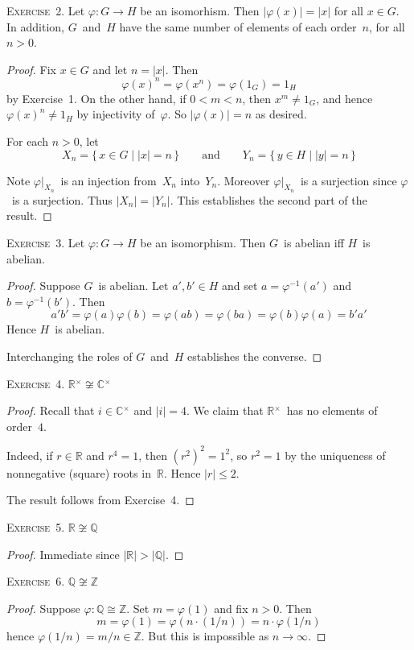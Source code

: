 \documentclass[letterpaper]{article}
\newcommand{\exercise}[1]{\goodbreak\noindent\textsc{Exercise~{#1}.}}
\newcommand{\Z}{\mathbb{Z}}
\newcommand{\Q}{\mathbb{Q}}
\newcommand{\R}{\mathbb{R}}
\newcommand{\C}{\mathbb{C}}
\newcommand{\iso}{\cong}
\newcommand{\mi}[1]{{#1}{}^{\times}}
\newcommand{\ord}[1]{|{#1}|}
\begin{document}
\exercise{2}
Let $\varphi:G\to H$ be an isomorhism. Then $\ord{\varphi(x)}=\ord{x}$ for all $x\in G$. In addition, $G$~and~$H$ have the same number of elements of each order~$n$, for all $n>0$.
\begin{proof}
Fix $x\in G$ and let $n=\ord{x}$. Then
$$\varphi(x)^n=\varphi(x^n)=\varphi(1_G)=1_H$$
by Exercise~1. On the other hand, if $0<m<n$, then $x^m\ne 1_G$, and hence $\varphi(x)^n\ne 1_H$ by injectivity of~$\varphi$. So $\ord{\varphi(x)}=n$ as desired.

For each $n>0$, let
$$X_n=\{\,x\in G\mid \ord{x}=n\,\}\qquad\text{and}\qquad Y_n=\{\,y\in H\mid \ord{y}=n\,\}$$

Note $\varphi|_{X_n}$~is an injection from~$X_n$ into~$Y_n$. Moreover $\varphi|_{X_n}$~is a surjection since $\varphi$~is a surjection. Thus $\ord{X_n}=\ord{Y_n}$. This establishes the second part of the result.
\end{proof}

\exercise{3}
Let $\varphi:G\to H$ be an isomorphism. Then $G$~is abelian iff $H$~is abelian.
\begin{proof}
Suppose $G$~is abelian. Let $a',b'\in H$ and set $a=\varphi^{-1}(a')$ and $b=\varphi^{-1}(b')$. Then
$$a'b'=\varphi(a)\varphi(b)=\varphi(ab)=\varphi(ba)=\varphi(b)\varphi(a)=b'a'$$
Hence $H$~is abelian.

Interchanging the roles of $G$~and~$H$ establishes the converse.
\end{proof}

\exercise{4}
$\mi{\R}\not\iso\mi{\C}$
\begin{proof}
Recall that $i\in\mi{\C}$ and $\ord{i}=4$. We claim that $\mi{\R}$~has no elements of order~$4$.

Indeed, if $r\in\R$ and $r^4=1$, then $(r^2)^2=1^2$, so $r^2=1$ by the uniqueness of nonnegative (square) roots in~$\R$. Hence $\ord{r}\le 2$.

The result follows from Exercise~4.
\end{proof}

\exercise{5}
$\R\not\iso\Q$
\begin{proof}
Immediate since $\ord{\R}>\ord{\Q}$.
\end{proof}

\exercise{6}
$\Q\not\iso\Z$
\begin{proof}
Suppose $\varphi:\Q\iso\Z$. Set $m=\varphi(1)$ and fix $n>0$. Then
$$m=\varphi(1)=\varphi(n\cdot(1/n))=n\cdot\varphi(1/n)$$
hence $\varphi(1/n)=m/n\in\Z$. But this is impossible as $n\to\infty$.
\end{proof}
\end{document}
